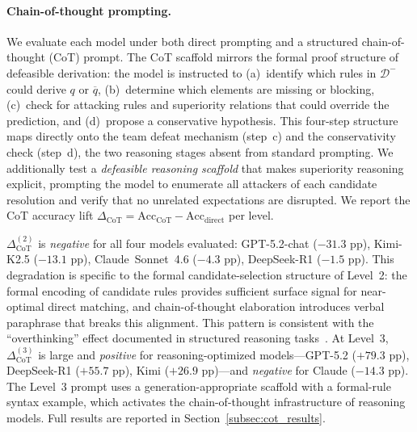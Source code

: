 \documentclass{article}
\theoremstyle{definition}
\newcommand{\Dm}{\mathcal{D}^{-}}
\newcommand{\comp}[1]{\overline{#1}}
\begin{document}
\paragraph{Chain-of-thought prompting.} We evaluate each model under both direct prompting and a structured chain-of-thought (CoT) prompt. The CoT scaffold mirrors the formal proof structure of defeasible derivation: the model is instructed to (a)~identify which rules in $\Dm$ could derive $q$ or $\comp{q}$, (b)~determine which elements are missing or blocking, (c)~check for attacking rules and superiority relations that could override the prediction, and (d)~propose a conservative hypothesis. This four-step structure maps directly onto the team defeat mechanism (step~c) and the conservativity check (step~d), the two reasoning stages absent from standard prompting. We additionally test a \emph{defeasible reasoning scaffold} that makes superiority reasoning explicit, prompting the model to enumerate all attackers of each candidate resolution and verify that no unrelated expectations are disrupted. We report the CoT accuracy lift $\Delta_{\mathrm{CoT}} = \mathrm{Acc}_{\mathrm{CoT}} - \mathrm{Acc}_{\mathrm{direct}}$ per level.

$\Delta_{\mathrm{CoT}}^{(2)}$ is \emph{negative} for all four models evaluated: GPT-5.2-chat ($-31.3$ pp), Kimi-K2.5 ($-13.1$ pp), Claude~Sonnet~4.6 ($-4.3$ pp), DeepSeek-R1 ($-1.5$ pp). This degradation is specific to the formal candidate-selection structure of Level~2: the formal encoding of candidate rules provides sufficient surface signal for near-optimal direct matching, and chain-of-thought elaboration introduces verbal paraphrase that breaks this alignment. This pattern is consistent with the ``overthinking'' effect documented in structured reasoning tasks~\cite{chen2024overthinking}. At Level~3, $\Delta_{\mathrm{CoT}}^{(3)}$ is large and \emph{positive} for reasoning-optimized models---GPT-5.2 ($+79.3$ pp), DeepSeek-R1 ($+55.7$ pp), Kimi ($+26.9$ pp)---and \emph{negative} for Claude ($-14.3$ pp). The Level~3 prompt uses a generation-appropriate scaffold with a formal-rule syntax example, which activates the chain-of-thought infrastructure of reasoning models. Full results are reported in Section~\ref{subsec:cot_results}.
\end{document}
